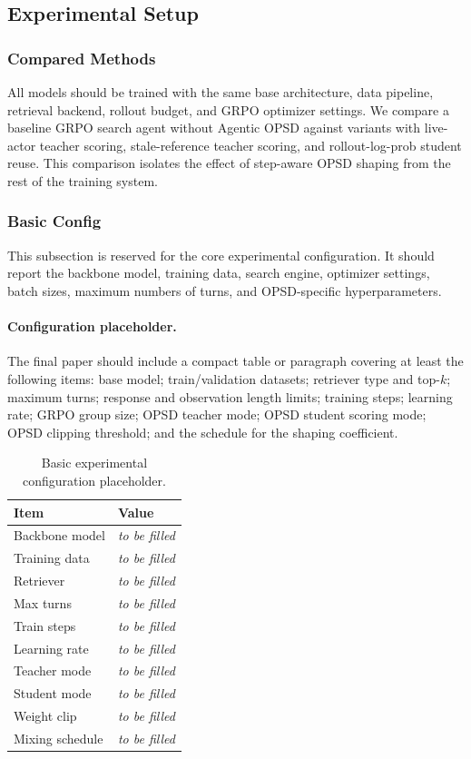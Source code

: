 \documentclass[11pt]{article}
\newcommand{\grpo}{GRPO}
\begin{document}
\subsection{Experimental Setup}
\subsubsection{Compared Methods}
All models should be trained with the same base architecture, data pipeline, retrieval backend, rollout budget, and \grpo{} optimizer settings. We compare a baseline \grpo{} search agent without Agentic OPSD against variants with live-actor teacher scoring, stale-reference teacher scoring, and rollout-log-prob student reuse. This comparison isolates the effect of step-aware OPSD shaping from the rest of the training system.

\subsubsection{Basic Config}
This subsection is reserved for the core experimental configuration. It should report the backbone model, training data, search engine, optimizer settings, batch sizes, maximum numbers of turns, and OPSD-specific hyperparameters.

\paragraph{Configuration placeholder.}
The final paper should include a compact table or paragraph covering at least the following items: base model; train/validation datasets; retriever type and top-$k$; maximum turns; response and observation length limits; training steps; learning rate; \grpo{} group size; OPSD teacher mode; OPSD student scoring mode; OPSD clipping threshold; and the schedule for the shaping coefficient.

\begin{table}[t]
\centering
\small
\begin{tabular}{ll}
\toprule
Item & Value \\
\midrule
Backbone model & \textit{to be filled} \\
Training data & \textit{to be filled} \\
Retriever & \textit{to be filled} \\
Max turns & \textit{to be filled} \\
Train steps & \textit{to be filled} \\
Learning rate & \textit{to be filled} \\
Teacher mode & \textit{to be filled} \\
Student mode & \textit{to be filled} \\
Weight clip & \textit{to be filled} \\
Mixing schedule & \textit{to be filled} \\
\bottomrule
\end{tabular}
\caption{Basic experimental configuration placeholder.}
\label{tab:basic-config}
\end{table}
\end{document}
